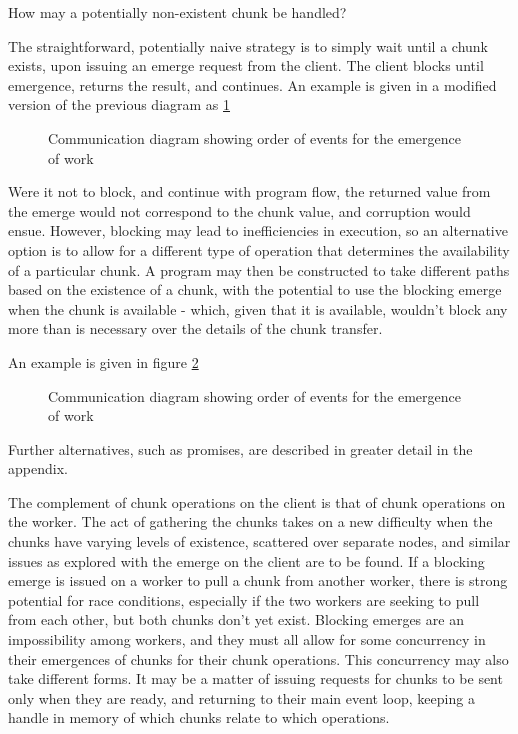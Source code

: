 How may a potentially non-existent chunk be handled?

The straightforward, potentially naive strategy is to simply wait until
a chunk exists, upon issuing an emerge request from the client. The
client blocks until emergence, returns the result, and continues. An
example is given in a modified version of the previous diagram as \cref{fig:work-emergence}

\begin{figure}
  \centering
  
  \caption{Communication diagram showing order of events for the emergence of work}
  \label{fig:work-emergence}
\end{figure}

Were it not to block, and continue with program flow, the returned value
from the emerge would not correspond to the chunk value, and corruption
would ensue. However, blocking may lead to inefficiencies in execution,
so an alternative option is to allow for a different type of operation
that determines the availability of a particular chunk. A program may
then be constructed to take different paths based on the existence of a
chunk, with the potential to use the blocking emerge when the chunk is
available - which, given that it is available, wouldn't block any more
than is necessary over the details of the chunk transfer.

An example is given in figure \cref{fig:work-request-checking}

\begin{figure}
  \centering
  
  \caption{Communication diagram showing order of events for the emergence
    of work}
  \label{fig:work-request-checking}
\end{figure}

Further alternatives, such as promises, are described in greater detail
in the appendix.

The complement of chunk operations on the client is that of chunk
operations on the worker. The act of gathering the chunks takes on a new
difficulty when the chunks have varying levels of existence, scattered
over separate nodes, and similar issues as explored with the emerge on
the client are to be found. If a blocking emerge is issued on a worker
to pull a chunk from another worker, there is strong potential for race
conditions, especially if the two workers are seeking to pull from each
other, but both chunks don't yet exist. Blocking emerges are an
impossibility among workers, and they must all allow for some
concurrency in their emergences of chunks for their chunk operations.
This concurrency may also take different forms. It may be a matter of
issuing requests for chunks to be sent only when they are ready, and
returning to their main event loop, keeping a handle in memory of which
chunks relate to which operations.

